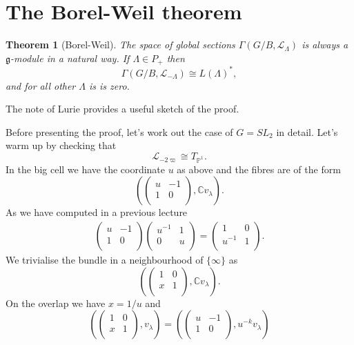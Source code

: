 \documentclass[12pt]{article}
\theoremstyle{plain}
\newtheorem{thm}{Theorem}[section]
\theoremstyle{definition}
\numberwithin{equation}{section}
\newcommand{\la}{\lambda}
\newcommand{\La}{\Lambda}
\newcommand{\C}{\mathbb{C}}
\newcommand{\bbP}{\mathbb{P}}
\newcommand{\g}{\mathfrak{g}}
\newcommand{\CL}{\mathcal{L}}
\begin{document}
\section{The Borel-Weil theorem}\label{sec:Borel-Weil}



\begin{thm}[Borel-Weil]
The space of global sections $\Gamma(G/B, \CL_{\Lambda})$ is always a $\g$-module in a natural way. If $\La \in P_+$ then
\[
\Gamma(G/B, \CL_{-\Lambda}) \cong L(\La)^*,
\]
and for all other $\La$ is is zero.
\end{thm}

The note of Lurie \cite{lurie-bwb} provides a useful sketch of the proof.

Before presenting the proof, let's work out the case of $G = SL_2$ in detail. Let's warm up by checking that
\[
\CL_{-2\varpi} \cong T_{\bbP^1}.
\]
In the big cell we have the coordinate $u$ as above and the fibres are of the form
\[
(\left(
\begin{array}{cc}
u & -1 \\
1 & 0 \\
\end{array}
\right), \C v_\la).
\]
As we have computed in a previous lecture
\begin{align*}
\left(
\begin{array}{cc}
u & -1 \\
1 & 0 \\
\end{array}
\right) \left(
\begin{array}{cc}
u^{-1} & 1 \\
0 & u \\
\end{array}
\right) = \left(
\begin{array}{cc}
1 & 0 \\
u^{-1} & 1 \\
\end{array}
\right).
\end{align*}
We trivialise the bundle in a neighbourhood of $\{\infty\}$ as
\[
(\left(
\begin{array}{cc}
1 & 0 \\
x & 1 \\
\end{array}
\right), \C v_\la).
\]
On the overlap we have $x = 1/u$ and
\[(\left(
\begin{array}{cc}
1 & 0 \\
x & 1 \\
\end{array}
\right), v_\la) = (\left(
\begin{array}{cc}
u & -1 \\
1 & 0 \\
\end{array}
\right), u^{-k} v_\la)
\]
\end{document}
